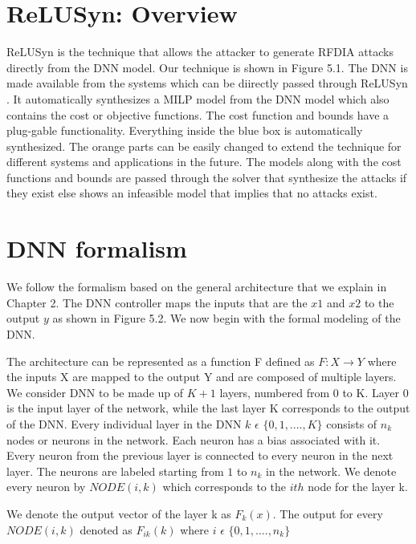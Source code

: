 \section{ReLUSyn: Overview}
ReLUSyn is the technique that allows the attacker to generate \ac{RFDIA} attacks directly from the \ac{DNN} model. 
Our technique is shown in Figure 5.1.
The \ac{DNN} is made available from the systems which can be diirectly passed through ReLUSyn . 
It automatically synthesizes a \ac{MILP} model from the \ac{DNN} model which also contains the cost or objective functions. 
The cost function and bounds have a plug-gable functionality. 
Everything inside the blue box is automatically synthesized.
The orange parts can be easily changed to extend the technique for different systems and applications in the future. 
The models along with the cost functions and bounds are passed through the solver that synthesize the attacks if they exist else shows an infeasible model that implies that no attacks exist. 
\section{DNN formalism}
We follow the formalism based on the general architecture that we explain in Chapter 2. 
The \ac{DNN} controller maps the inputs that are the $x1$ and $x2$ to the output $y$ as shown in  Figure 5.2.   
We now begin with the formal modeling of the \ac{DNN}.


The architecture can be represented as a function F defined as $F: X \rightarrow Y$ where the inputs X are mapped to the output Y and are composed of multiple layers. 
We consider \ac{DNN} to be made up of $K + 1$ layers, numbered from 0 to K.
Layer 0 %
is the input layer of the network, while
the last layer K corresponds to the output of the \ac{DNN}.
Every individual layer in the \ac{DNN} $k$ $\epsilon$ $\{0,1,....,K\}$ consists of $n_k$ nodes or neurons in the network.
Each neuron has a bias associated with it. 
Every neuron from the previous layer is connected to every neuron in the next layer. 
The neurons are labeled starting from $1$ to $n_k$ in the network. 
We denote every neuron by $NODE(i,k)$ which corresponds to the $ith$ node for the layer k. 

We denote the output vector of the layer k as $F_k(x)$.
The output for every $NODE(i,k)$ denoted as $F_{ik}(k)$ where $i$ $\epsilon$ $\{0,1,....,n_k\}$ 

